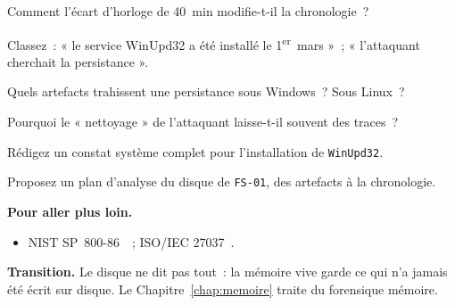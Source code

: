 \begin{boxexo}[title={\ding{45}\quad Exercice~12.5. Recaler \niveaumoyen}]
Comment l'écart d'horloge de 40~min modifie-t-il la chronologie~?
\end{boxexo}

\begin{boxexo}[title={\ding{45}\quad Exercice~12.6. Tracé ou déduit \niveaumoyen}]
Classez~: « le service WinUpd32 a été installé le 1\textsuperscript{er}~mars »~;
« l'attaquant cherchait la persistance ».
\end{boxexo}

\begin{boxexo}[title={\ding{45}\quad Exercice~12.7. Persistance \niveaumoyen}]
Quels artefacts trahissent une persistance sous Windows~? Sous Linux~?
\end{boxexo}

\begin{boxexo}[title={\ding{45}\quad Exercice~12.8. Nettoyage \niveaumoyen}]
Pourquoi le « nettoyage » de l'attaquant laisse-t-il souvent des traces~?
\end{boxexo}

\begin{boxexo}[title={\ding{45}\quad Exercice~12.9. Constat système \niveauexpert}]
Rédigez un constat système complet pour l'installation de \texttt{WinUpd32}.
\end{boxexo}

\begin{boxexo}[title={\ding{45}\quad Exercice~12.10. Plan d'analyse \niveauexpert}]
Proposez un plan d'analyse du disque de \texttt{FS-01}, des artefacts à la
chronologie.
\end{boxexo}

\bigskip

\begin{boxinfo}
\textbf{Pour aller plus loin.}
\begin{itemize}
    \item NIST SP~800-86~\cite{nist80086}~; ISO/IEC 27037~\cite{iso27037}.
\end{itemize}
\end{boxinfo}

\begin{boxinfo}
\textbf{Transition.} Le disque ne dit pas tout~: la mémoire vive garde ce qui
n'a jamais été écrit sur disque. Le Chapitre~\ref{chap:memoire} traite du
forensique mémoire.
\end{boxinfo}

